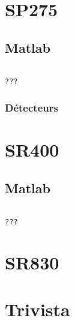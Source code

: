 \documentclass[11pt,francais]{book} %
\begin{document}

\section{SP275}

\subsection{Matlab}

\begin{lstlisting}[frame=single,caption={Exemple d'utilisation du SP275 avec Matlab},label={lst:exsp275},breaklines=true,]  % Start your code-block

???
\end{lstlisting}

\subsubsection{Détecteurs}


\section{SR400}

\subsection{Matlab}

\begin{lstlisting}[frame=single,caption={Exemple d'utilisation du SR400 avec Matlab},label={lst:exsr400},breaklines=true,]  % Start your code-block

???
\end{lstlisting}


\section{SR830}


\section{Trivista}
\end{document}
